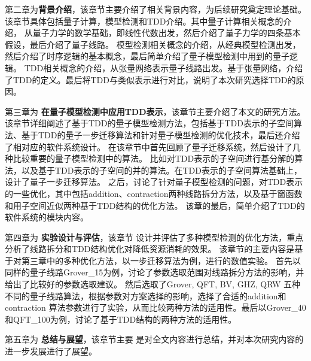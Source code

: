 第二章为\textbf{背景介绍}，该章节主要介绍了相关背景内容，为后续研究奠定理论基础。该章节具体包括量子计算，模型检测和TDD介绍。其中量子计算相关概念的介绍，
从量子力学的数学基础，即线性代数出发，然后介绍了量子力学的四条基本假设，最后介绍了量子线路。
模型检测相关概念的介绍，从经典模型检测出发，然后介绍了时序逻辑的基本概念，最后简单介绍了量子模型检测中用到的量子逻辑。
TDD相关概念的介绍，从张量网络表示量子线路出发。基于张量网络，介绍了TDD的定义。最后将TDD与类似表示进行对比，说明了本次研究选择TDD的原因。


第三章为 \textbf{在量子模型检测中应用TDD表示}，该章节主要介绍了本文的研究方法。
该章节详细阐述了基于TDD的量子模型检测方法，包括基于TDD表示的子空间算法、基于TDD的量子一步迁移算法和针对量子模型检测的优化技术，最后还介绍了相对应的软件系统设计。
在该章节中首先回顾了量子迁移系统，然后设计了几种比较重要的量子模型检测中的算法。
比如对TDD表示的子空间进行基分解的算法，以及基于TDD表示的子空间的并的算法。在TDD表示的子空间算法基础上，设计了量子一步迁移算法。
之后，讨论了针对量子模型检测的问题，对TDD表示的一些优化，其中包括addition、contraction两种线路拆分方法，以及基于窗函数和用子空间近似两种基于TDD结构的优化方法。
该章的最后，简单介绍了TDD的软件系统的模块内容。

第四章为 \textbf{实验设计与评估}，该章节
设计并评估了多种模型检测的优化方法，重点分析了线路拆分和TDD结构优化对降低资源消耗的效果。
该章节的主要内容是基于对第三章中的多种优化方法，以一步迁移算法为例，进行的数值实验。
首先以同样的量子线路Grover\_15为例，讨论了参数选取范围对线路拆分方法的影响，并给出了比较好的参数选取建议。
然后选取了Grover, QFT, BV, GHZ, QRW
五种不同的量子线路算法，根据参数对方案选择的影响，选择了合适的addition和contraction
算法参数进行了实验，从而比较两种方法的适用性。最后以Grover\_40和QFT\_100为例，讨论了基于TDD结构的两种方法的适用性。

第五章为 \textbf{总结与展望}，该章节主要
是对全文内容进行总结，并对本次研究内容的进一步发展进行了展望。